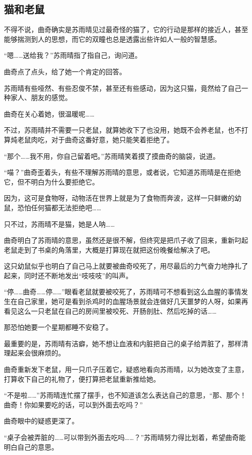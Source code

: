 \subsection{猫和老鼠}

不得不说，曲奇确实是苏雨晴见过最奇怪的猫了，它的行动是那样的接近人，甚至能够揣测到人的思想，而它的双瞳也总是透露出些许如人一般的智慧感。

“嗯……送给我？”苏雨晴指了指自己，询问道。

曲奇点了点头，给了她一个肯定的回答。

苏雨晴有些哑然、有些忍俊不禁，甚至还有些感动，因为这只猫，竟然给了自己一种家人、朋友的感觉。

曲奇在关心着她，很温暖呢……

不过，苏雨晴并不需要一只老鼠，就算她收下了也没用，她既不会养老鼠，也不打算炖老鼠肉吃，对于曲奇这番好意，她只能笑着拒绝了。

“那个……我不用，你自己留着吧。”苏雨晴笑着摸了摸曲奇的脑袋，说道。

“喵？”曲奇歪着头，有些不理解苏雨晴的意思，或者说，它知道苏雨晴是在拒绝它，但不明白为什么要拒绝它。

因为，这可是食物呀，动物活在世界上就是为了食物而奔波，这样一只鲜嫩的幼鼠，恐怕任何猫都无法拒绝吧……

只不过，苏雨晴不是猫，她是人呐……

曲奇明白了苏雨晴的意思，虽然还是很不解，但终究是把爪子收了回来，重新叼起老鼠走到了书桌的角落里，大概是打算现在就把这份晚餐给解决了吧。

这只幼鼠似乎也明白了自己马上就要被曲奇咬死了，用尽最后的力气奋力地挣扎了起来，同时还不断地发出“吱吱吱”的叫声。

“停……曲奇……停……”眼看老鼠就要被咬死了，苏雨晴可不想看到这么血腥的事情发生在自己家里，她可是看到杀鸡时的血腥场景就会连做好几天噩梦的人呀，如果再看见这么一只老鼠在自己的房间里被咬死、开肠剖肚、然后吃掉的话……

那恐怕她要一个星期都睡不安稳了。

最重要的是，苏雨晴有洁癖，她不想让血液和内脏把自己的桌子给弄脏了，那样清理起来会很麻烦的。

曲奇重新发下老鼠，用一只爪子压着它，疑惑地看向苏雨晴，以为她改变了主意，打算收下自己的礼物了，便打算把老鼠重新推给她。

“不是啦……”苏雨晴连忙摆了摆手，也不知道该怎么表达自己的意思，“那、那个！曲奇！你如果要吃的话，可以到外面去吃吗？”

曲奇眼中的疑惑更深了。

“桌子会被弄脏的……可以带到外面去吃吗……？”苏雨晴努力得比划着，希望曲奇能明白自己的意思。

